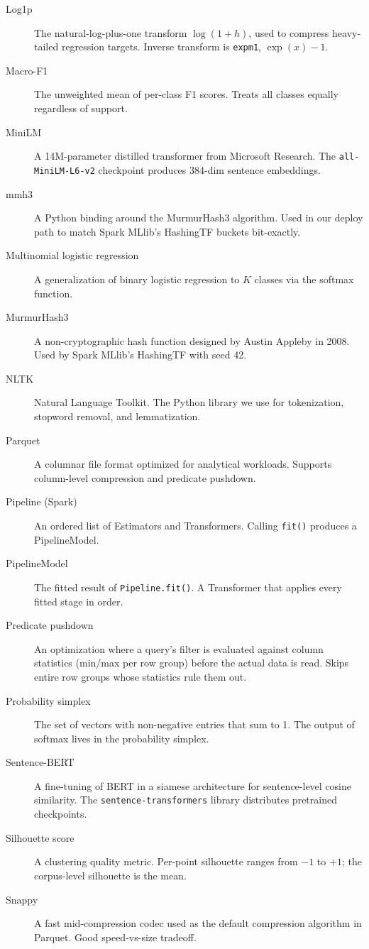 \documentclass[11pt,letterpaper]{book}
\begin{document}
\begin{description}
\item[Log1p] The natural-log-plus-one transform $\log(1 + h)$, used to compress heavy-tailed regression targets. Inverse transform is \texttt{expm1}, $\exp(x) - 1$.
\item[Macro-F1] The unweighted mean of per-class F1 scores. Treats all classes equally regardless of support.
\item[MiniLM] A 14M-parameter distilled transformer from Microsoft Research. The \texttt{all-MiniLM-L6-v2} checkpoint produces 384-dim sentence embeddings.
\item[mmh3] A Python binding around the MurmurHash3 algorithm. Used in our deploy path to match Spark MLlib's HashingTF buckets bit-exactly.
\item[Multinomial logistic regression] A generalization of binary logistic regression to $K$ classes via the softmax function.
\item[MurmurHash3] A non-cryptographic hash function designed by Austin Appleby in 2008. Used by Spark MLlib's HashingTF with seed 42.
\item[NLTK] Natural Language Toolkit. The Python library we use for tokenization, stopword removal, and lemmatization.
\item[Parquet] A columnar file format optimized for analytical workloads. Supports column-level compression and predicate pushdown.
\item[Pipeline (Spark)] An ordered list of Estimators and Transformers. Calling \texttt{fit()} produces a PipelineModel.
\item[PipelineModel] The fitted result of \texttt{Pipeline.fit()}. A Transformer that applies every fitted stage in order.
\item[Predicate pushdown] An optimization where a query's filter is evaluated against column statistics (min/max per row group) before the actual data is read. Skips entire row groups whose statistics rule them out.
\item[Probability simplex] The set of vectors with non-negative entries that sum to 1. The output of softmax lives in the probability simplex.
\item[Sentence-BERT] A fine-tuning of BERT in a siamese architecture for sentence-level cosine similarity. The \texttt{sentence-transformers} library distributes pretrained checkpoints.
\item[Silhouette score] A clustering quality metric. Per-point silhouette ranges from $-1$ to $+1$; the corpus-level silhouette is the mean.
\item[Snappy] A fast mid-compression codec used as the default compression algorithm in Parquet. Good speed-vs-size tradeoff.

\end{description}
\end{document}
